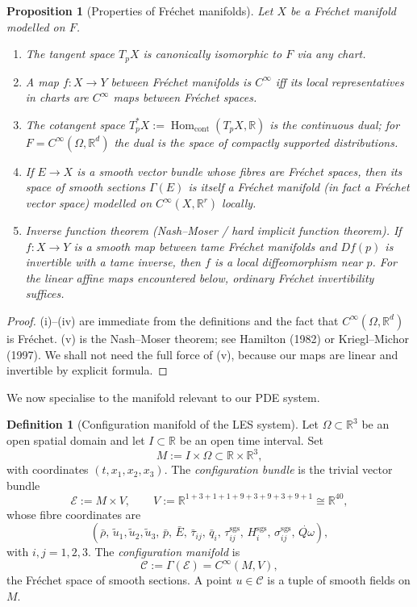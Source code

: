 \documentclass[11pt]{article}
\newtheorem{proposition}[theorem]{Proposition}
\theoremstyle{definition}
\newtheorem{definition}[theorem]{Definition}
\theoremstyle{remark}
\newcommand{\R}{\mathbb{R}}
\newcommand{\E}{\mathcal{E}}
\newcommand{\sgs}{\mathrm{sgs}}
\newcommand{\barrho}{\bar{\rho}}
\newcommand{\barp}{\bar{p}}
\newcommand{\barE}{\bar{E}}
\newcommand{\bartau}{\bar{\tau}}
\newcommand{\barq}{\bar{q}}
\newcommand{\tilu}{\widetilde{u}}
\newcommand{\Qdot}{\dot{Q\omega}}
\begin{document}
\begin{proposition}[Properties of Fr\'echet manifolds]
\label{prop:frechet-props}
Let $X$ be a Fr\'echet manifold modelled on $F$.
\begin{enumerate}
\item The tangent space $T_pX$ is canonically isomorphic to $F$ via any chart.
\item A map $f:X\to Y$ between Fr\'echet manifolds is $C^\infty$ iff its local
      representatives in charts are $C^\infty$ maps between Fr\'echet spaces.
\item The cotangent space $T_p^*X:=\operatorname{Hom}_{\text{cont}}(T_pX,\R)$
      is the continuous dual; for $F=C^\infty(\Omega,\R^d)$ the dual is the
      space of compactly supported distributions.
\item If $E\to X$ is a smooth vector bundle whose fibres are Fr\'echet spaces,
      then its space of smooth sections $\Gamma(E)$ is itself a Fr\'echet
      manifold (in fact a Fr\'echet vector space) modelled on
      $C^\infty(X,\R^r)$ locally.
\item \emph{Inverse function theorem (Nash--Moser / hard implicit function
      theorem).}  If $f:X\to Y$ is a smooth map between tame Fr\'echet
      manifolds and $Df(p)$ is invertible with a tame inverse, then $f$ is a
      local diffeomorphism near $p$.  For the linear affine maps encountered
      below, ordinary Fr\'echet invertibility suffices.
\end{enumerate}
\end{proposition}

\begin{proof}
(i)--(iv) are immediate from the definitions and the fact that
$C^\infty(\Omega,\R^d)$ is Fr\'echet.  (v) is the Nash--Moser theorem; see
Hamilton (1982) or Kriegl--Michor (1997).  We shall not need the full force of
(v), because our maps are linear and invertible by explicit formula.
\end{proof}

We now specialise to the manifold relevant to our PDE system.

\begin{definition}[Configuration manifold of the LES system]
Let $\Omega\subset\R^3$ be an open spatial domain and let
$I\subset\R$ be an open time interval.  Set
\[
M:=I\times\Omega\subset\R\times\R^3,
\]
with coordinates $(t,x_1,x_2,x_3)$.  The \emph{configuration bundle} is the
trivial vector bundle
\[
\E:=M\times V,\qquad
V:=\R^{1+3+1+1+9+3+9+3+9+1}\cong\R^{40},
\]
whose fibre coordinates are
\[
(\barrho,\,\tilu_1,\tilu_2,\tilu_3,\,\barp,\,\barE,\,
\bartau_{ij},\,\barq_i,\,\tau^{\sgs}_{ij},\,H^{\sgs}_i,\,
\sigma^{\sgs}_{ij},\,\Qdot),
\]
with $i,j=1,2,3$.  The \emph{configuration manifold} is
\[
\mathcal C:=\Gamma(\E)=C^\infty(M,V),
\]
the Fr\'echet space of smooth sections.  A point $u\in\mathcal C$ is a tuple
of smooth fields on $M$.
\end{definition}
\end{document}
